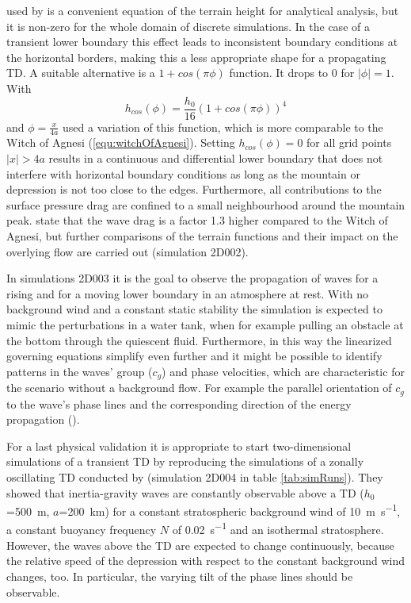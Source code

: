 used by \textcite{queney_problem_1948} is a convenient equation of the terrain height for analytical analysis, but it is non-zero for the whole domain of discrete simulations. In the case of a transient lower boundary this effect leads to inconsistent boundary conditions at the horizontal borders, making this a less appropriate shape for a propagating TD. A suitable alternative is a $1+cos(\pi \phi)$ function. It drops to 0 for $|\phi| = 1$. With 
%
\begin{equation}
    h_{cos}(\phi) = \frac{h_0}{16} (1+cos(\pi \phi))^4
    \label{equ:cosMtn}
\end{equation}
%
and $ \phi = \frac{x}{4a}$ \textcite{epifanio_three-dimensional_2001} used a variation of this function, which is more comparable to the Witch of Agnesi (\ref{equ:witchOfAgnesi}). Setting $h_{cos}(\phi)=0$ for all grid points $|x| > 4a$ results in a continuous and differential lower boundary that does not interfere with horizontal boundary conditions as long as the mountain or depression is not too close to the edges. Furthermore, all contributions to the surface pressure drag are confined to a small neighbourhood around the mountain peak. \textcite{metz_are_2021} state that the wave drag is a factor 1.3 higher compared to the Witch of Agnesi, but further comparisons of the terrain functions and their impact on the overlying flow are carried out (simulation 2D002).

In simulations 2D003 it is the goal to observe the propagation of waves for a rising and for a moving lower boundary in an atmosphere at rest. With no background wind and a constant static stability the simulation is expected to mimic the perturbations in a water tank, when for example pulling an obstacle at the bottom through the quiescent fluid. Furthermore, in this way the linearized governing equations simplify even further and it might be possible to identify patterns in the waves' group ($c_g$) and phase velocities, which are characteristic for the scenario without a background flow. For example the parallel orientation of $c_g$ to the wave's phase lines and the corresponding direction of the energy propagation (\cite{lin_mesoscale_2007}).

For a last physical validation it is appropriate to start two-dimensional simulations of a transient TD by reproducing the simulations of a zonally oscillating TD conducted by \textcite{prusa_all-scale_2003} (simulation 2D004 in table \ref{tab:simRuns}). They showed that inertia-gravity waves are constantly observable above a TD ($h_0$=\SI{500}{\meter}, $a$=\SI{200}{\kilo\meter}) for a constant stratospheric background wind of \SI{10}{\meter\per\second}, a constant buoyancy frequency $N$ of \SI{0.02}{\second^{-1}} and an isothermal stratosphere. However, the waves above the TD are expected to change continuously, because the relative speed of the depression with respect to the constant background wind changes, too. In particular, the varying tilt of the phase lines should be observable. 

